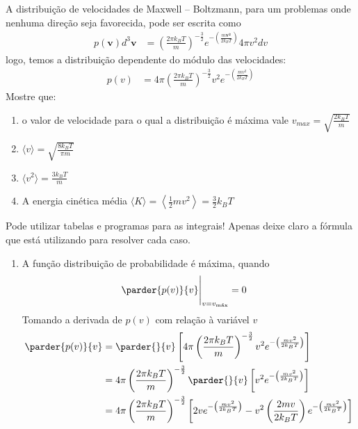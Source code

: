 \begin{prob}
	A distribuição de velocidades de Maxwell – Boltzmann, para um problemas onde nenhuma
	direção seja favorecida, pode ser escrita como
	\begin{align}
		p(\mathbf{v})d^3\mathbf{v}&=\left(\frac{2\pi k_BT}{m}\right)^{-\frac{3}{2}}e^{-\left(\frac{m\mathbf{v^2}}{2k_BT}\right)}4\pi v^2dv
	\end{align}
	logo, temos a distribuição dependente do módulo das velocidades:
	\begin{align}
		p(v)&=4\pi\left(\frac{2\pi k_BT}{m}\right)^{-\frac{3}{2}}v^2e^{-\left(\frac{mv^2}{2k_BT}\right)}
	\end{align}
	Mostre que:
	\begin{enumerate}[label=\alph *)]
		\item o valor de velocidade para o qual a distribuição é máxima vale $v_{max}=\sqrt{\frac{2k_BT}{m}}$
		\item $\langle v\rangle=\sqrt{\frac{8k_BT}{\pi m}}$
		\item $\langle v^2\rangle=\frac{3k_BT}{m}$
		\item A energia cinética média $\langle K\rangle=\left\langle \frac{1}{2}mv^2\right\rangle=\frac{3}{2}k_BT$
	\end{enumerate}
	Pode utilizar tabelas e programas para as integrais! Apenas deixe claro a fórmula que está utilizando
	para resolver cada caso.
	\begin{sol}
		\begin{enumerate}[label=\alph *)]
			\item A função distribuição de probabilidade é máxima, quando
			\begin{align}
				\parder{p(v)}{v}\Biggr |_{v=v_{\textrm{máx}}}&=0
			\end{align}
			Tomando a derivada de $p(v)$ com relação à variável $v$
			\begin{align}
				\begin{split}
					\parder{p(v)}{v}&=\parder{}{v}\left[4\pi\left(\frac{2\pi k_BT}{m}\right)^{-\frac{3}{2}}v^2e^{-\left(\frac{mv^2}{2k_BT}\right)}\right]\\
					&=4\pi\left(\frac{2\pi k_BT}{m}\right)^{-\frac{3}{2}}\parder{}{v}\left[v^2e^{-\left(\frac{mv^2}{2k_BT}\right)}\right]\\
					&=4\pi\left(\frac{2\pi k_BT}{m}\right)^{-\frac{3}{2}}\left[2ve^{-\left(\frac{mv^2}{2k_BT}\right)}-v^2\left(\frac{2mv}{2k_BT}\right)e^{-\left(\frac{mv^2}{2k_BT}\right)}\right]\\

\end{split}
\end{align}
\end{enumerate}
\end{sol}
\end{prob}
